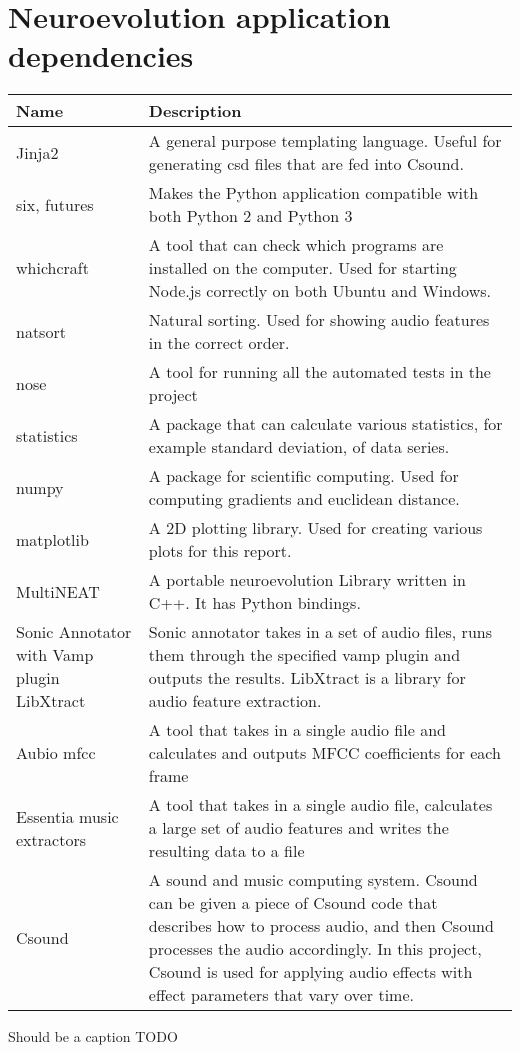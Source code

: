 
\chapter{Neuroevolution application dependencies}
\label{appendix:python_dependencies}

\begin{minipage}{\linewidth}
\centering
{} \label{tab:title} 
\begin{tabular}{ C{1.5in} C{4.6in} }\toprule[1.5pt]
\bf Name & \bf Description \\
\midrule
  Jinja2 & A general purpose templating language. Useful for generating csd files that are fed into Csound. \\
\midrule
  six, futures & Makes the Python application compatible with both Python 2 and Python 3 \\
\midrule
  whichcraft & A tool that can check which programs are installed on the computer. Used for starting Node.js correctly on both Ubuntu and Windows. \\
\midrule
  natsort & Natural sorting. Used for showing audio features in the correct order. \\
\midrule
  nose & A tool for running all the automated tests in the project \\
\midrule
  statistics & A package that can calculate various statistics, for example standard deviation, of data series. \\
\midrule
  numpy & A package for scientific computing. Used for computing gradients and euclidean distance. \\
\midrule
  matplotlib & A 2D plotting library. Used for creating various plots for this report. \\
\midrule
  MultiNEAT & A portable neuroevolution Library written in C++. It has Python bindings. \\
\midrule
  Sonic Annotator with Vamp plugin LibXtract & Sonic annotator takes in a set of audio files, runs them through the specified vamp plugin and outputs the results. LibXtract is a library for audio feature extraction. \\
\midrule
  Aubio mfcc & A tool that takes in a single audio file and calculates and outputs MFCC coefficients for each frame \\
\midrule
  Essentia music extractors & A tool that takes in a single audio file, calculates a large set of audio features and writes the resulting data to a file \\
\midrule
  Csound & A sound and music computing system. Csound can be given a piece of Csound code that describes how to process audio, and then Csound processes the audio accordingly. In this project, Csound is used for applying audio effects with effect parameters that vary over time. \\

\bottomrule[1.25pt]
\end {tabular}\par
\bigskip
Should be a caption TODO
\end{minipage}